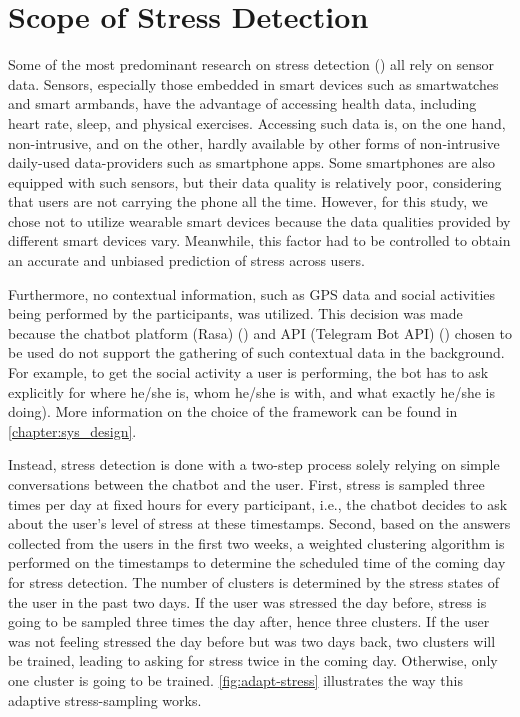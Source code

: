 \section{Scope of Stress Detection} \label{scope_stress_detection}
Some of the most predominant research on stress detection (\cite{7_stress_detection, 8_stress_detection, 9_stress_detection}) all rely on sensor data. Sensors, especially those embedded in smart devices such as smartwatches and smart armbands, have the advantage of accessing health data, including heart rate, sleep, and physical exercises. Accessing such data is, on the one hand, non-intrusive, and on the other, hardly available by other forms of non-intrusive daily-used data-providers such as smartphone apps. Some smartphones are also equipped with such sensors, but their data quality is relatively poor, considering that users are not carrying the phone all the time. However, for this study, we chose not to utilize wearable smart devices because the data qualities provided by different smart devices vary. Meanwhile, this factor had to be controlled to obtain an accurate and unbiased prediction of stress across users.

Furthermore, no contextual information, such as GPS data and social activities being performed by the participants, was utilized. This decision was made because the chatbot platform (Rasa) (\cite{10_rasa}) and API (Telegram Bot API) (\cite{11_tg_bot_api}) chosen to be used do not support the gathering of such contextual data in the background. For example, to get the social activity a user is performing, the bot has to ask explicitly for where he/she is, whom he/she is with, and what exactly he/she is doing). More information on the choice of the framework can be found in \autoref{chapter:sys_design}. \bigskip

\noindent Instead, stress detection is done with a two-step process solely relying on simple conversations between the chatbot and the user. First, stress is sampled three times per day at fixed hours for every participant, i.e., the chatbot decides to ask about the user’s level of stress at these timestamps. Second, based on the answers collected from the users in the first two weeks, a weighted clustering algorithm is performed on the timestamps to determine the scheduled time of the coming day for stress detection. The number of clusters is determined by the stress states of the user in the past two days. If the user was stressed the day before, stress is going to be sampled three times the day after, hence three clusters. If the user was not feeling stressed the day before but was two days back, two clusters will be trained, leading to asking for stress twice in the coming day. Otherwise, only one cluster is going to be trained. \autoref{fig:adapt-stress} illustrates the way this adaptive stress-sampling works.

